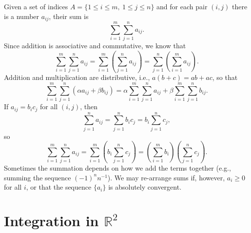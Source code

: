 \documentclass[letter-paper]{tufte-book}
\begin{document}
Given a set of indices $A = \{1\leq i\leq m,\ 1\leq j\leq n\}$ and for each pair
$(i,j)$ there is a number $a_{ij}$, their sum is
\begin{equation*}
  \sum_{i=1}^m \sum_{j=1}^n a_{ij}.
\end{equation*}
Since addition is associative and commutative, we know that
\begin{equation*}
  \sum_{i=1}^m \sum_{j=1}^n a_{ij} 
  = \sum_{i=1}^m \left(\sum_{j=1}^n a_{ij}\right)
  = \sum_{j=1}^n \left( \sum_{i=1}^m a_{ij}\right).
\end{equation*}
Addition and multiplication are distributive, i.e., $a(b+c) = ab + ac$, so that
\begin{equation*}
  \sum_{i=1}^m \sum_{j=1}^n (\alpha a_{ij} + \beta b_{ij}) = 
  \alpha \sum_{i=1}^m \sum_{j=1}^n a_{ij} 
  + \beta \sum_{i=1}^m \sum_{j=1}^n b_{ij}.
\end{equation*}
If $a_{ij} = b_i c_j$ for all $(i,j)$, then
\begin{equation*}
  \sum_{j=1}^n a_{ij} = \sum_{j=1}^n b_i c_j = b_i \sum_{j=1}^n c_j,
\end{equation*}
so
\begin{equation*}
  \sum_{i=1}^m \sum_{j=1}^n a_{ij} 
  = \sum_{i=1}^m \left(b_i \sum_{j=1}^n c_j\right)
  = \left(\sum_{i=1}^m b_i\right) \left(\sum_{j=1}^n c_j\right).
\end{equation*}
Sometimes the summation depends on how we add the terms together (e.g., summing
the sequence $(-1)^n n^{-1}$). We may re-arrange sums if, however, $a_i\geq0$
for all $i$, or that the sequence $\{a_i\}$ is absolutely convergent.


\section{Integration in $\mathbb{R}^2$}
\end{document}
